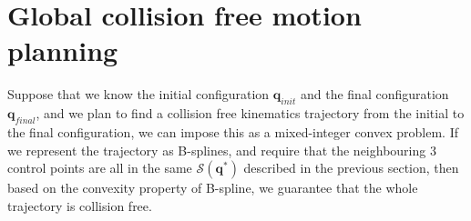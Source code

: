 \documentclass{article}
\renewcommand{\vec}[1]{\mathbf{#1}}
\begin{document}
\section{Global collision free motion planning}
Suppose that we know the initial configuration $\vec{q}_{init}$ and the final configuration $\vec{q}_{final}$, and we plan to find a collision free kinematics trajectory from the initial to the final configuration, we can impose this as a mixed-integer convex problem. If we represent the trajectory as B-splines, and require that the neighbouring 3 control points are all in the same $\mathcal{S}(\vec{q}^*)$ described in the previous section, then based on the convexity property of B-spline, we guarantee that the whole trajectory is collision free.
\end{document}
